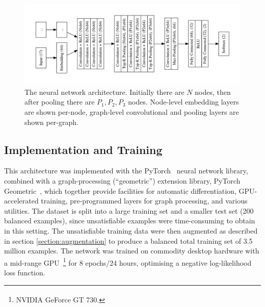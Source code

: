 \documentclass[runningheads]{llncs}
\begin{document}
\begin{figure}
	\centering
	\includegraphics[width=\linewidth]{network}
	\caption{The neural network architecture. Initially there are \(N\) nodes, then after pooling there are \(P_1, P_2, P_3\) nodes. Node-level embedding layers are shown per-node, graph-level convolutional and pooling layers are shown per-graph.}
	\label{figure:network}
\end{figure}

\subsection{Implementation and Training}
This architecture was implemented with the PyTorch~\cite{pytorch} neural network library, combined with a graph-processing (``geometric'') extension library, PyTorch Geometric~\cite{pytorch-geometric}, which together provide facilities for automatic differentiation, GPU-accelerated training, pre-programmed layers for graph processing, and various utilities.
The dataset is split into a large training set and a smaller test set (200 balanced examples), since unsatisfiable examples were time-consuming to obtain in this setting.
The unsatisfiable training data were then augmented as described in section \ref{section:augmentation} to produce a balanced total training set of 3.5 million examples.
The network was trained on commodity desktop hardware with a mid-range GPU~\footnote{NVIDIA\textsuperscript{\textregistered} GeForce\textsuperscript{\textregistered} GT 730.} for 8 epochs/24 hours, optimising a negative log-likelihood loss function.
\end{document}
